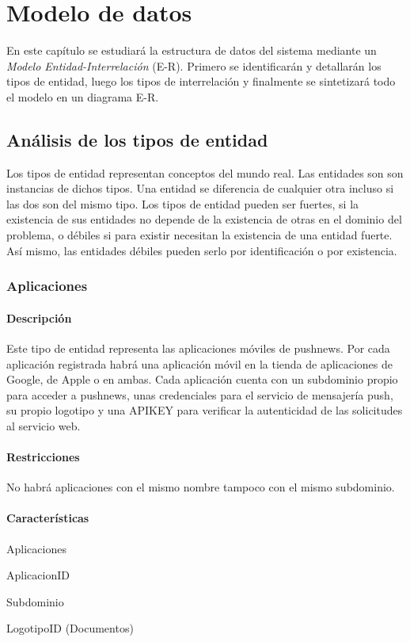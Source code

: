 \chapter{Modelo de datos}
En este capítulo se estudiará la estructura de datos del sistema mediante un \textit{Modelo Entidad-Interrelación} (E-R).
Primero se identificarán y detallarán los tipos de entidad, luego los tipos de interrelación y finalmente se sintetizará todo el modelo en un diagrama E-R.

\section {Análisis de los tipos de entidad}\label{analisis-tipos-entidad}
Los tipos de entidad representan conceptos del mundo real. Las entidades son son instancias de dichos tipos. Una entidad se diferencia de cualquier otra incluso si las dos son del mismo tipo.
Los tipos de entidad pueden ser fuertes, si la existencia de sus entidades no depende de la existencia de otras en el dominio del problema, o débiles si para existir necesitan la existencia de una entidad fuerte. Así mismo, las entidades débiles pueden serlo por identificación o por existencia.

\subsection{Aplicaciones}
\subsubsection*{Descripción}
Este tipo de entidad representa las aplicaciones móviles de pushnews. Por cada aplicación registrada habrá una aplicación móvil en la tienda de aplicaciones de Google, de Apple o en ambas. Cada aplicación cuenta con un subdominio propio para acceder a pushnews, unas credenciales para el servicio de mensajería push, su propio logotipo y una APIKEY para verificar la autenticidad de las solicitudes al servicio web.

\subsubsection*{Restricciones}
No habrá aplicaciones con el mismo nombre tampoco con el mismo subdominio.

\subsubsection*{Características}
\begin{description}[nosep,style=multiline,labelindent=0.8cm,leftmargin=4.5cm,font=\normalfont]
    \item[Nombre] Aplicaciones
    \item[Id. principal] AplicacionID
    \item[Id. alternativo] Subdominio
    \item[Atrib. heredados] LogotipoID (Documentos)
\end{description}

